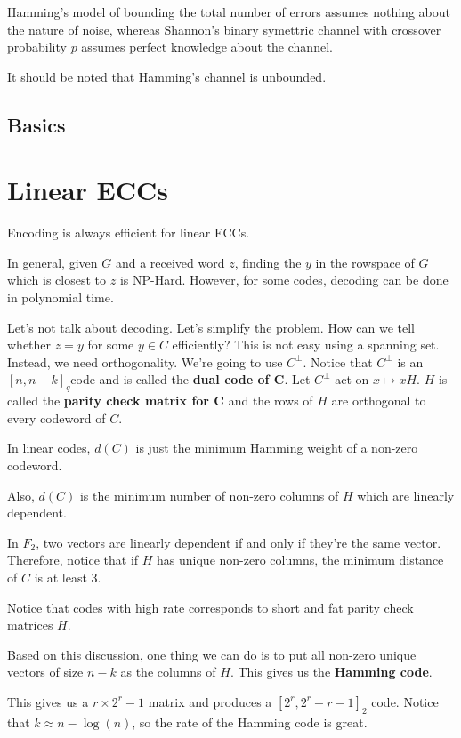 \documentclass{article}
\theoremstyle{definition}
\begin{document}
Hamming's model of bounding the total number of errors assumes nothing about the
nature of noise, whereas Shannon's binary symettric channel with crossover probability
$p$ assumes perfect knowledge about the channel.

It should be noted that Hamming's channel is unbounded.

\subsection{Basics}



\newpage

\section{Linear ECCs}

Encoding is always efficient for linear ECCs.

In general, given $G$ and a received word $z$, finding the $y$ in the rowspace of $G$ which
is closest to $z$ is NP-Hard. However, for some codes, decoding can be done in polynomial time.

Let's not talk about decoding. Let's simplify the problem. How can we tell whether $z = y$
for some $y \in C$ efficiently? This is not easy using a spanning set. Instead, we need orthogonality.
We're going to use $C^{\perp}$. Notice that $C^{\perp}$ is an $[n,n-k]_{q} $code and is called
the \textbf{dual code of C}. Let $C^{\perp}$ act on $x \mapsto xH$. $H$ is called the
\textbf{parity check matrix for C} and the rows of $H$ are orthogonal to every codeword
of $C$.

In linear codes, $d(C)$ is just the minimum Hamming weight of a non-zero codeword.

Also, $d(C)$ is the minimum number of non-zero columns of $H$ which are linearly dependent.

In $F_{2}$, two vectors are linearly dependent if and only if they're the same vector.
Therefore, notice that if $H$ has unique non-zero columns, the minimum distance of $C$
is at least 3.

Notice that codes with high rate corresponds to short and fat parity check matrices $H$.

Based on this discussion, one thing we can do is to put all non-zero unique vectors
of size $n-k$ as the columns of $H$. This gives us the \textbf{Hamming code}.

This gives us a $r \times 2^{r} - 1$ matrix and produces a $[2^{r},2^{r} - r - 1]_{2}$
code. Notice that $k \approx n - \log (n)$, so the rate of the Hamming code is great.
\end{document}

